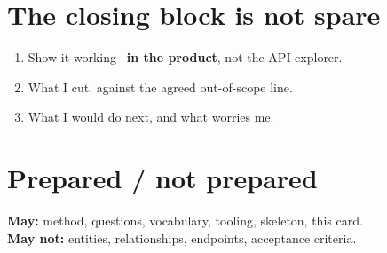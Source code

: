 \section{The closing block is not spare}
\begin{enumerate}[nosep]
  \item Show it working \dash\ \textbf{in the product}, not the API explorer.
  \item What I cut, against the agreed out-of-scope line.
  \item What I would do next, and what worries me.
\end{enumerate}

\section{Prepared / not prepared}
\textbf{May:} method, questions, vocabulary, tooling, skeleton, this card.\\
\textbf{May not:} entities, relationships, endpoints, acceptance criteria.


